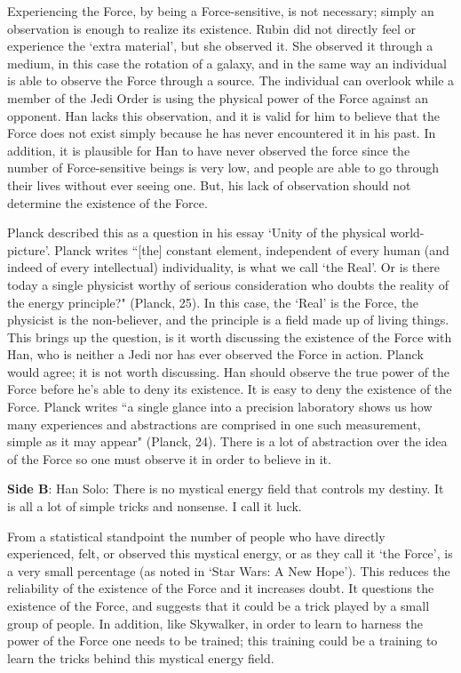 \documentclass[11pt, oneside]{article}
\begin{document}
\par Experiencing the Force, by being a Force-sensitive, is not necessary; simply an observation is enough to realize its existence. Rubin did not directly feel or experience the `extra material', but she observed it. She observed it through a medium, in this case the rotation of a galaxy, and in the same way an individual is able to observe the Force through a source. The individual can overlook while a member of the Jedi Order is using the physical power of the Force against an opponent. Han lacks this observation, and it is valid for him to believe that the Force does not exist simply because he has never encountered it in his past. In addition, it is plausible for Han to have never observed the force since the number of Force-sensitive beings is very low, and people are able to go through their lives without ever seeing one. But, his lack of observation should not determine the existence of the Force.

\par Planck described this as a question in his essay `Unity of the physical world-picture'. Planck writes ``[the] constant element, independent of every human (and indeed of every intellectual) individuality, is what we call `the Real'. Or is there today a single physicist worthy of serious consideration who doubts the reality of the energy principle?" (Planck, 25). In this case, the `Real' is the Force, the physicist is the non-believer, and the principle is a field made up of living things. This brings up the question, is it worth discussing the existence of the Force with Han, who is neither a Jedi nor has ever observed the Force in action. Planck would agree; it is not worth discussing. Han should observe the true power of the Force before he's able to deny its existence. It is easy to deny the existence of the Force. Planck writes ``a single glance into a precision laboratory shows us how many experiences and abstractions are comprised in one such measurement, simple as it may appear" (Planck, 24). There is a lot of abstraction over the idea of the Force so one must observe it in order to believe in it.

\newpage 

\noindent \textbf{Side B}: Han Solo: There is no mystical energy field that controls my destiny. It is all a lot of simple tricks and nonsense. I call it luck. 

\par From a statistical standpoint the number of people who have directly experienced, felt, or observed this mystical energy, or as they call it `the Force', is a very small percentage (as noted in `Star Wars: A New Hope'). This reduces the reliability of the existence of the Force and it increases doubt. It questions the existence of the Force, and suggests that it could be a trick played by a small group of people. In addition, like Skywalker, in order to learn to harness the power of the Force one needs to be trained; this training could be a training to learn the tricks behind this mystical energy field.
\end{document}

